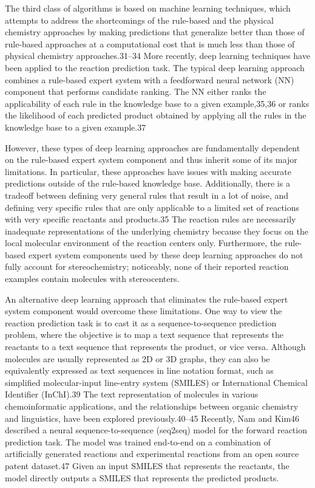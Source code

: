 The third class of algorithms is based on machine learning techniques, which attempts to address the shortcomings of the rule-based and the physical chemistry approaches by making predictions that generalize better than those of rule-based approaches at a computational cost that is much less than those of physical chemistry approaches.31–34 More recently, deep learning techniques have been applied to the reaction prediction task. The typical deep learning approach combines a rule-based expert system with a feedforward neural network (NN) component that performs candidate ranking. The NN either ranks the applicability of each rule in the knowledge base to a given example,35,36 or ranks the likelihood of each predicted product obtained by applying all the rules in the knowledge base to a given example.37 

However, these types of deep learning approaches are fundamentally dependent on the rule-based expert system component and thus inherit some of its major limitations. In particular, these approaches have issues with making accurate predictions outside of the rule-based knowledge base. Additionally, there is a tradeoff between defining very general rules that result in a lot of noise, and defining very specific rules that are only applicable to a limited set of reactions with very specific reactants and products.35 The reaction rules are necessarily inadequate representations of the underlying chemistry because they focus on the local molecular environment of the reaction centers only. Furthermore, the rule-based expert system components used by these deep learning approaches do not fully account for stereochemistry; noticeably, none of their reported reaction examples contain molecules with stereocenters.

An alternative deep learning approach that eliminates the rule-based expert system component would overcome these limitations. One way to view the reaction prediction task is to cast it as a sequence-to-sequence prediction problem, where the objective is to map a text sequence that represents the reactants to a text sequence that represents the product, or vice versa. Although molecules are usually represented as 2D or 3D graphs, they can also be equivalently expressed as text sequences in line notation format, such as simplified molecular-input line-entry system (SMILES) \cite{weininger1988smiles} or International Chemical Identifier (InChI).39 The text representation of molecules in various chemoinformatic applications, and the relationships between organic chemistry and linguistics, have been explored previously.40–45 Recently, Nam and Kim46 described a neural sequence-to-sequence (seq2seq) model for the forward reaction prediction task. The model was trained end-to-end on a combination of artificially generated reactions and experimental reactions from an open source patent dataset.47 Given an input SMILES that represents the reactants, the model directly outputs a SMILES that represents the predicted products.


